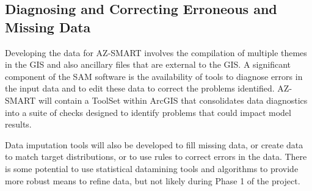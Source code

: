 \subsection{Diagnosing and Correcting Erroneous and Missing Data}

Developing the data for AZ-SMART involves the compilation of multiple
themes in the GIS and also ancillary files that are external to the
GIS.  A significant component of the SAM software is the availability
of tools to diagnose errors in the input data and to edit these data
to correct the problems identified.  AZ-SMART will contain a ToolSet
within ArcGIS that consolidates data diagnostics into a suite of
checks designed to identify problems that could impact model results.

Data imputation tools will also be developed to fill missing data,
or create data to match target distributions, or to use rules to
correct errors in the data.  There is some potential to use statistical
datamining tools and algorithms to provide more robust means to refine
data, but not likely during Phase 1 of the project.
